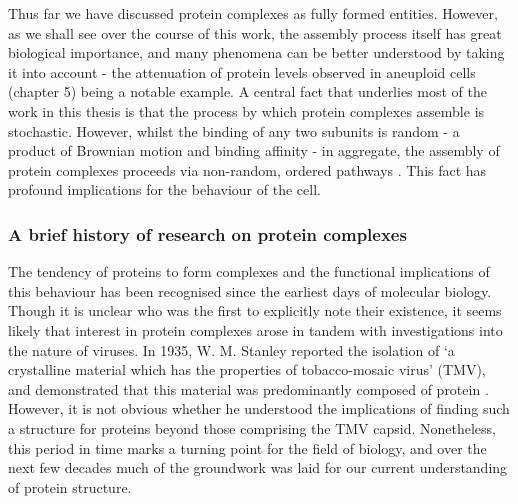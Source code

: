 \documentclass[a4paper,11pt,twoside,openright]{scrbook}
\begin{document}
Thus far we have discussed protein complexes as fully formed entities. However, as we shall see over the course of this work, the assembly process itself has great biological importance, and many phenomena can be better understood by taking it into account - the attenuation of protein levels observed in aneuploid cells (chapter 5) being a notable example. A central fact that underlies most of the work in this thesis is that the process by which protein complexes assemble is stochastic. However, whilst the binding of any two subunits is random - a product of Brownian motion and binding affinity - in aggregate, the assembly of protein complexes proceeds via non-random, ordered pathways \cite{Levy2008, Marsh2013}. This fact has profound implications for the behaviour of the cell.


\subsubsection{A brief history of research on protein complexes}
The tendency of proteins to form complexes and the functional implications of this behaviour has been recognised since the earliest days of molecular biology. Though it is unclear who was the first to explicitly note their existence, it seems likely that interest in protein complexes arose in tandem with investigations into the nature of viruses. In 1935, W. M. Stanley reported the isolation of `a crystalline material which has the properties of tobacco-mosaic virus' (TMV), and demonstrated that this material was predominantly composed of protein \cite{Stanley1935}. However, it is not obvious whether he understood the implications of finding such a structure for proteins beyond those comprising the TMV capsid. Nonetheless, this period in time marks a turning point for the field of biology, and over the next few decades much of the groundwork was laid for our current understanding of protein structure.
\end{document}
